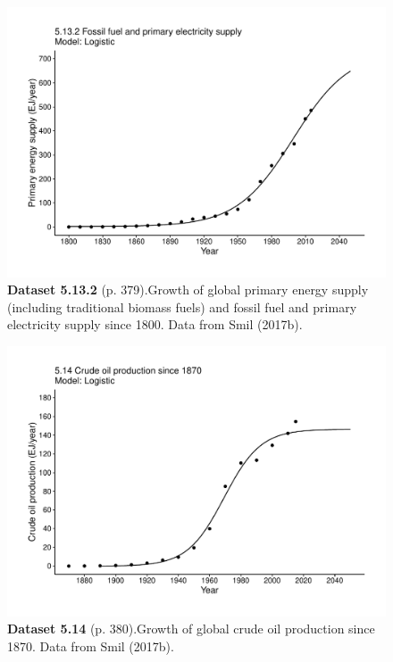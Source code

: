 \documentclass[aps,rmp,preprint,superscriptaddress,10pt,onecolumn]{article}
\begin{document}
\clearpage
\begin{figure}[h]
\includegraphics[width=\textwidth]{output/figs-ggplot/5.13.2.pdf}
\caption*{\textbf{Dataset 5.13.2} (p. 379).Growth of global primary energy supply (including traditional biomass fuels) and fossil fuel and primary electricity supply since 1800. Data from Smil (2017b). }
\end{figure}
	
\clearpage
\begin{figure}[h]
\includegraphics[width=\textwidth]{output/figs-ggplot/5.14.pdf}
\caption*{\textbf{Dataset 5.14} (p. 380).Growth of global crude oil production since 1870. Data from Smil (2017b).}
\end{figure}
	
\end{document}
